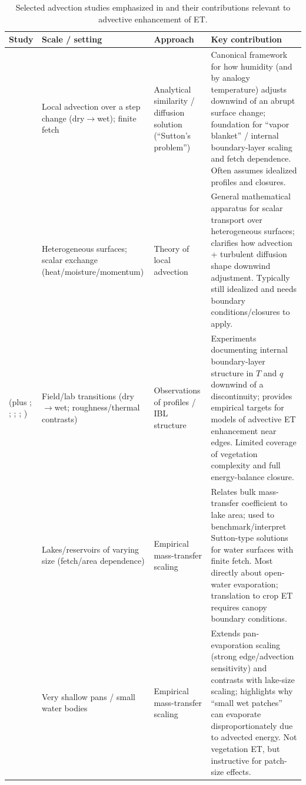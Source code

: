 \documentclass{article}
\begin{document}
    
    \begin{table}[htbp]
    \centering
    \caption{Selected advection studies emphasized in \citet{brutsaert1982} and their contributions relevant to advective enhancement of ET.}
    \label{tab:advection_studies_brutsaert}
    \renewcommand{\arraystretch}{1.15}
    \begin{tabular}{p{3.2cm}|p{3.5cm}|p{3.5cm}|p{6.0cm}}
    \hline
    \textbf{Study} & \textbf{Scale / setting} & \textbf{Approach} & \textbf{Key contribution} \\
    \hline
    \citet{sutton1934wind} & Local advection over a step change (dry$\rightarrow$wet); finite fetch & Analytical similarity / diffusion solution (“Sutton’s problem”) & Canonical framework for how humidity (and by analogy temperature) adjusts downwind of an abrupt surface change; foundation for “vapor blanket” / internal boundary-layer scaling and fetch dependence. Often assumes idealized profiles and closures. \\
    \hline
    \citet{philip1959theory} & Heterogeneous surfaces; scalar exchange (heat/moisture/momentum) & Theory of local advection & General mathematical apparatus for scalar transport over heterogeneous surfaces; clarifies how advection + turbulent diffusion shape downwind adjustment. Typically still idealized and needs boundary conditions/closures to apply. \\
    \hline
    \citet{rider1963horizontal} (plus \citet{millar1964effect}; \citet{dyer1965}; \citet{davenport1967}; \citet{lang1974}; \citet{brakke1978}) & Field/lab transitions (dry$\rightarrow$wet; roughness/thermal contrasts) & Observations of profiles / IBL structure & Experiments documenting internal boundary-layer structure in $T$ and $q$ downwind of a discontinuity; provides empirical targets for models of advective ET enhancement near edges. Limited coverage of vegetation complexity and full energy-balance closure. \\
    \hline
    \citet{harbeck1962} & Lakes/reservoirs of varying size (fetch/area dependence) & Empirical mass-transfer scaling & Relates bulk mass-transfer coefficient to lake area; used to benchmark/interpret Sutton-type solutions for water surfaces with finite fetch. Most directly about open-water evaporation; translation to crop ET requires canopy boundary conditions. \\
    \hline
    \citet{brutsaertYu1968} & Very shallow pans / small water bodies & Empirical mass-transfer scaling & Extends pan-evaporation scaling (strong edge/advection sensitivity) and contrasts with lake-size scaling; highlights why “small wet patches” can evaporate disproportionately due to advected energy. Not vegetation ET, but instructive for patch-size effects. \\

\end{tabular}
\end{table}
\end{document}
